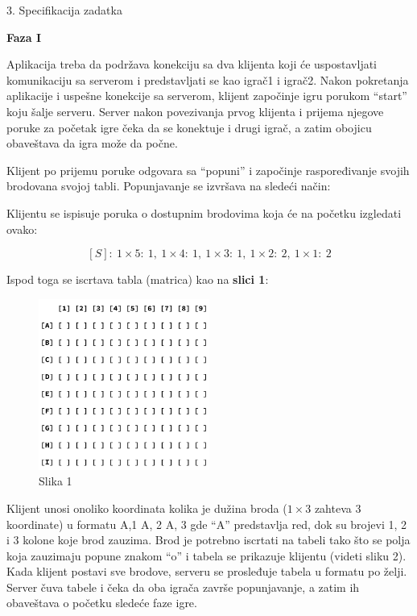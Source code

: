 \newpage
\large{3. Specifikacija zadatka}
\normalsize

\textbf{Faza I}

Aplikacija treba da podržava konekciju sa dva klijenta koji će uspostavljati komunikaciju sa serverom i predstavljati se kao igrač1 i igrač2. Nakon pokretanja aplikacije i uspešne konekcije sa serverom, klijent započinje igru porukom “start” koju šalje serveru. Server nakon povezivanja prvog klijenta i prijema njegove poruke za početak igre čeka da se konektuje i drugi igrač, a zatim obojicu obaveštava da igra može da počne.

Klijent po prijemu poruke odgovara sa “popuni” i započinje raspoređivanje svojih brodovana svojoj tabli. Popunjavanje se izvršava na sledeći način:

Klijentu se ispisuje poruka o dostupnim brodovima koja će na početku izgledati ovako:

$$[S]:\ {1\times5:\ 1,\ 1\times4:\ 1,\ 1\times3:\ 1,\ 1\times2:\ 2,\ 1\times1:\ 2}$$

Ispod toga se iscrtava tabla (matrica) kao na \textbf{slici 1}:

\begin{figure}[H]
    \centering
    \includegraphics[width=0.5\textwidth]{Slike/PTP/PTP_Pocetak.png}
    \caption*{Slika 1}
    \label{fig:ptp_pocetak}
\end{figure}

Klijent unosi onoliko koordinata kolika je dužina broda ($1\times3$ zahteva 3 koordinate) u formatu {A,1 A, 2 A, 3} gde “A” predstavlja red, dok su brojevi 1, 2 i 3 kolone koje brod zauzima. Brod je potrebno iscrtati na tabeli tako što se polja koja zauzimaju popune znakom “o” i tabela se prikazuje klijentu (videti sliku 2). Kada klijent postavi sve brodove, serveru se prosleđuje tabela u formatu po želji. Server čuva tabele i čeka da oba igrača završe popunjavanje, a zatim ih obaveštava o početku sledeće faze igre.

